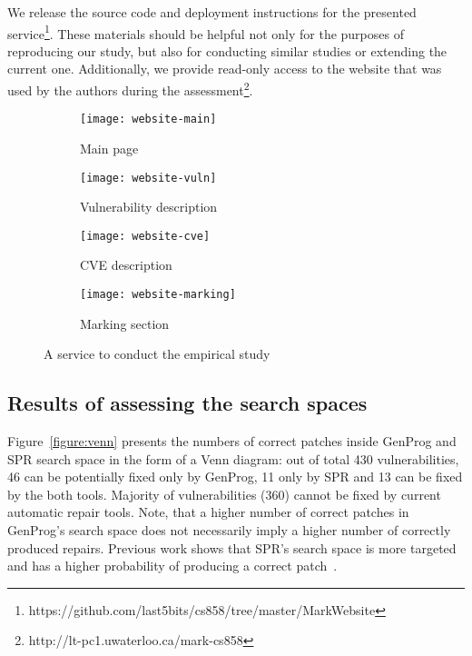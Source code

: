 We release the source code and deployment instructions for the presented service\footnote{https://github.com/last5bits/cs858/tree/master/MarkWebsite}.
These materials should be helpful not only for the purposes of reproducing our study, but also for conducting similar studies or extending the current one. Additionally, we provide read-only access to the website that was used by the authors during the assessment\footnote{http://lt-pc1.uwaterloo.ca/mark-cs858}.

\begin{figure}[t!]

\begin{subfigure}[b]{\linewidth}
    \texttt{[image: website-main]}
    \caption{Main page}
    \label{figure:website-main}
\end{subfigure}

\begin{subfigure}[b]{\linewidth}
    \texttt{[image: website-vuln]}
    \caption{Vulnerability description}
    \label{figure:website-vuln}
\end{subfigure}

\begin{subfigure}[b]{\linewidth}
    \texttt{[image: website-cve]}
    \caption{CVE description}
    \label{figure:website-cve}
\end{subfigure}

\begin{subfigure}[b]{\linewidth}
    \texttt{[image: website-marking]}
    \caption{Marking section}
    \label{figure:website-marking}
\end{subfigure}

\caption{A service to conduct the empirical study}
\label{figure:website}
\end{figure}

\subsection{Results of assessing the search spaces}

Figure~\ref{figure:venn} presents the numbers of correct patches inside GenProg and SPR search space in the form of a Venn diagram: out of total 430 vulnerabilities, 46 can be potentially fixed only by GenProg, 11 only by SPR and 13 can be fixed by the both tools.
Majority of vulnerabilities (360) cannot be fixed by current automatic repair tools.
Note, that a higher number of correct patches in GenProg's search space does not necessarily imply a higher number of correctly produced repairs. Previous work shows that SPR's search space is more targeted and has a higher probability of producing a correct patch~\cite{long2015staged}.

